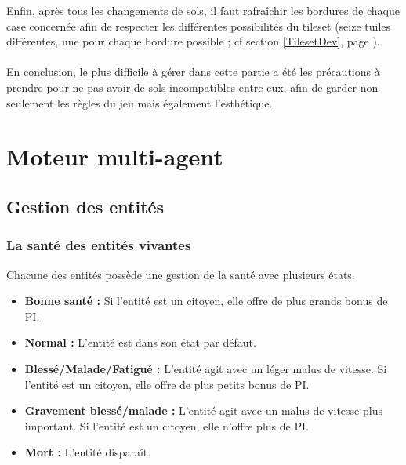 \documentclass[a4paper]{memoir}
\begin{document}
				Enfin, après tous les changements de sols, il faut rafraîchir les bordures de chaque case concernée afin de respecter les différentes possibilités du tileset (seize tuiles différentes, une pour chaque bordure possible ; cf section \ref{TilesetDev}, page \pageref{TilesetDev}).\\
				\\
				En conclusion, le plus difficile à gérer dans cette partie a été les précautions à prendre pour ne pas avoir de sols incompatibles entre eux, afin de garder non seulement les règles du jeu mais également l'esthétique.

		\section{Moteur multi-agent}
		
			\subsection{Gestion des entités}
			
				\subsubsection{La santé des entités vivantes}
					Chacune des entités possède une gestion de la santé avec plusieurs états.
					\begin{itemize}[label=$\bullet$]
						\item \textbf{Bonne santé :} Si l'entité est un citoyen, elle offre de plus grands bonus de PI.
						\item \textbf{Normal :} L'entité est dans son état par défaut.
						\item \textbf{Blessé/Malade/Fatigué :} L'entité agit avec un léger malus de vitesse. Si l'entité est un citoyen, elle offre de plus petits bonus de PI.
						\item \textbf{Gravement blessé/malade :} L'entité agit avec un malus de vitesse plus important. Si l'entité est un citoyen, elle n'offre plus de PI.
						\item \textbf{Mort :} L'entité disparaît.
					\end{itemize}
					
\end{document}
